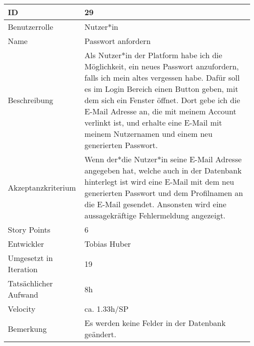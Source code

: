 \begin{tabularx}{\textwidth}{|p{}|X|}
	\hline
	ID & 29 \\
	\hline
	Benutzerrolle & Nutzer*in \\
	\hline
	Name & Passwort anfordern\\
	\hline
	Beschreibung & Als Nutzer*in der Platform habe ich die Möglichkeit, ein neues Passwort anzufordern, falls ich mein altes vergessen habe. Dafür soll es im Login Bereich einen Button geben, mit dem sich ein Fenster öffnet. Dort gebe ich die E-Mail Adresse an, die mit meinem Account verlinkt ist, und erhalte eine E-Mail mit meinem Nutzernamen und einem neu generierten Passwort. \\
	\hline
	Akzeptanzkriterium & Wenn der*die Nutzer*in seine E-Mail Adresse angegeben hat, welche auch in der Datenbank hinterlegt ist wird eine E-Mail mit dem neu generierten Passwort und dem Profilnamen an die E-Mail gesendet. Ansonsten wird eine aussagekräftige Fehlermeldung angezeigt. \\
	\hline
	Story Points & 6\\
	\hline
	Entwickler & Tobias Huber\\
	\hline
	Umgesetzt in Iteration & 19\\
	\hline
	Tatsächlicher Aufwand & 8h\\
	\hline
	Velocity & ca. 1.33h/SP\\
	\hline
	Bemerkung & Es werden keine Felder in der Datenbank geändert.\\
	\hline
\end{tabularx}
\vspace{20pt}
